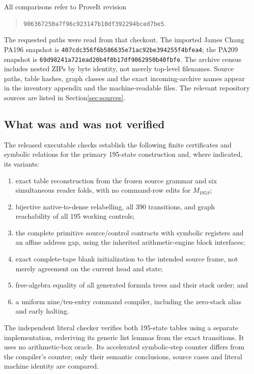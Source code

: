 \documentclass[11pt,a4paper]{article}
\begin{document}
All comparisons refer to ProveIt revision
\begin{quote}\small
\nolinkurl{906367250a7f96c923147b10df392294bced7be5}.
\end{quote}
The requested paths were read from that checkout. The imported James
Chang PA196 snapshot is
\nolinkurl{407cdc356f6b586635e71ac92be394255f4bfea4};
the PA209 snapshot is
\nolinkurl{69d98241a721ead20b4f0b17df9062950b40fbfe}.
The archive census includes nested ZIPs by byte identity, not merely
top-level filenames. Source paths, table hashes, graph classes and
the exact incoming-archive names appear in the inventory appendix and
the machine-readable files. The relevant repository sources are
listed in Section\ref{sec:sources}.

\subsection{What was and was not verified}

The released executable checks establish the following finite
certificates and symbolic relations for the primary 195-state construction and, where indicated, its variants:
\begin{enumerate}
\item exact table reconstruction from the frozen source grammar and six
      simultaneous reader folds, with no command-row edits for $M_{195S}$;
\item bijective native-to-dense relabelling, all 390 transitions, and
      graph reachability of all 195 working controls;
\item the complete primitive source/control contracts with symbolic
      registers and an affine address gap, using the inherited
      arithmetic-engine block interfaces;
\item exact complete-tape blank initialization to the intended
      source frame, not merely agreement on the current head and state;
\item free-algebra equality of all generated formula trees and their
      stack order; and
\item a uniform nine/ten-entry command compiler, including the zero-stack
      alias and early halting.
\end{enumerate}
The independent literal checker verifies both 195-state tables using a
separate implementation, rederiving its generic list lemmas from the
exact transitions. It uses no arithmetic-box oracle. Its accelerated symbolic-step counter differs
from the compiler's counter; only their semantic conclusions, source
cases and literal machine identity are compared.
\end{document}
